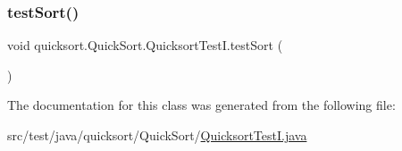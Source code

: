 \subsubsection{\texorpdfstring{test\+Sort()}{testSort()}}
{\footnotesize\ttfamily void quicksort.\+Quick\+Sort.\+Quicksort\+Test\+I.\+test\+Sort (\begin{DoxyParamCaption}{ }\end{DoxyParamCaption})}



The documentation for this class was generated from the following file\+:\begin{DoxyCompactItemize}
\item 
src/test/java/quicksort/\+Quick\+Sort/\hyperlink{_quicksort_test_i_8java}{Quicksort\+Test\+I.\+java}\end{DoxyCompactItemize}
